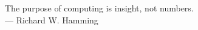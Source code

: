 \cleardoublepage
\thispagestyle{empty}

\vspace*{3cm}

\begin{raggedleft}
	The purpose of computing is insight, not numbers. \\
	--- Richard W. Hamming \\
\end{raggedleft}

\vspace{4cm}

\begin{center}
\end{center}

